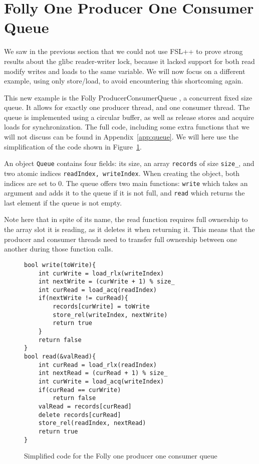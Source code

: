 \section{Folly One Producer One Consumer Queue}
\label{sec:2b}
We saw in the previous section that we could not use FSL++ to prove strong results about the glibc reader-writer lock, because it lacked support for both read modify writes and loads to the same variable. We will now focus on a different example, using only store/load, to avoid encountering this shortcoming again.

This new example is the Folly ProducerConsumerQueue \cite{queue}, a concurrent fixed size queue. It allows for exactly one producer thread, and one consumer thread. The queue is implemented using a circular buffer, as well as release stores and acquire loads for synchronization. The full code, including some extra functions that we will not discuss can be found in Appendix~\ref{app:queue}. We will here use the simplification of the code shown in Figure~\ref{fig:queueCyclic}.

An object \texttt{Queue} contains four fields: its size, an array \texttt{records} of size \texttt{size\_}, and two atomic indices \texttt{readIndex, writeIndex}. When creating the object, both indices are set to $0$. The queue offers two main functions: \texttt{write} which takes an argument and adds it to the queue if it is not full, and \texttt{read} which returns the last element if the queue is not empty. 

Note here that in spite of its name, the read function requires full ownership to the array slot it is reading, as it deletes it when returning it. This means that the producer and consumer threads need to transfer full ownership between one another during those function calls.

\begin{figure}
\begin{lstlisting}
bool write(toWrite){
	int curWrite = load_rlx(writeIndex)
	int nextWrite = (curWrite + 1) % size_
	int curRead = load_acq(readIndex)
	if(nextWrite != curRead){
		records[curWrite] = toWrite
		store_rel(writeIndex, nextWrite)
		return true
	}
	return false
}
bool read(&valRead){
	int curRead = load_rlx(readIndex)
	int nextRead = (curRead + 1) % size_
	int curWrite = load_acq(writeIndex)
	if(curRead == curWrite)
		return false
	valRead = records[curRead]
	delete records[curRead]
	store_rel(readIndex, nextRead)
	return true
}

\end{lstlisting}
		\caption{Simplified code for the Folly one producer one consumer queue}
		\label{fig:queueCyclic}
\end{figure}

